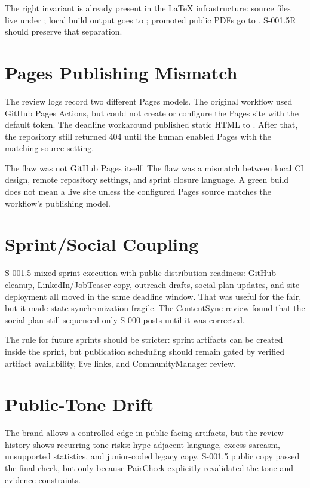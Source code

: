 \documentclass[a4paper,11pt,openany]{report}
\begin{document}
The right invariant is already present in the LaTeX infrastructure: source
files live under ; local build output goes to
; promoted public PDFs go to
. S-001.5R should preserve that separation.

\section{Pages Publishing Mismatch}

The review logs record two different Pages models. The original workflow used
GitHub Pages Actions, but  could not create or
configure the Pages site with the default token. The deadline workaround
published static HTML to . After that, the repository still
returned 404 until the human enabled Pages with the matching source setting.

The flaw was not GitHub Pages itself. The flaw was a mismatch between local CI
design, remote repository settings, and sprint closure language. A green build
does not mean a live site unless the configured Pages source matches the
workflow's publishing model.

\section{Sprint/Social Coupling}

S-001.5 mixed sprint execution with public-distribution readiness: GitHub
cleanup, LinkedIn/JobTeaser copy, outreach drafts, social plan updates, and
site deployment all moved in the same deadline window. That was useful for the
fair, but it made state synchronization fragile. The ContentSync review found
that the social plan still sequenced only S-000 posts until it was corrected.

The rule for future sprints should be stricter: sprint artifacts can be created
inside the sprint, but publication scheduling should remain gated by verified
artifact availability, live links, and CommunityManager review.

\section{Public-Tone Drift}

The brand allows a controlled edge in public-facing artifacts, but the review
history shows recurring tone risks: hype-adjacent language, excess sarcasm,
unsupported statistics, and junior-coded legacy copy. S-001.5 public copy
passed the final check, but only because PairCheck explicitly revalidated the
tone and evidence constraints.
\end{document}
